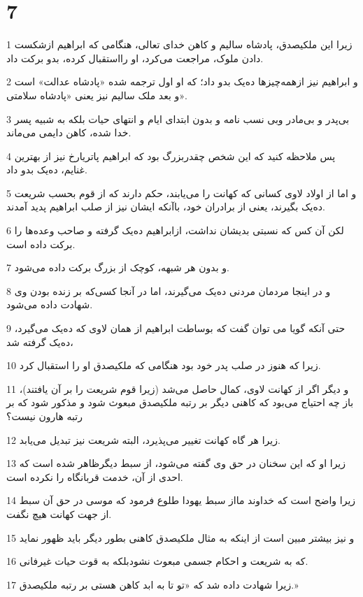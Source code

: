 \chapter{7}

\par 1 زیرا این ملکیصدق، پادشاه سالیم و کاهن خدای تعالی، هنگامی که ابراهیم ازشکست دادن ملوک، مراجعت می‌کرد، او رااستقبال کرده، بدو برکت داد.
\par 2 و ابراهیم نیز ازهمه‌چیزها ده‌یک بدو داد؛ که او اول ترجمه شده «پادشاه عدالت» است و بعد ملک سالیم نیز یعنی «پادشاه سلامتی».
\par 3 بی‌پدر و بی‌مادر وبی نسب نامه و بدون ابتدای ایام و انتهای حیات بلکه به شبیه پسر خدا شده، کاهن دایمی می‌ماند.
\par 4 پس ملاحظه کنید که این شخص چقدربزرگ بود که ابراهیم پاتریارخ نیز از بهترین غنایم، ده‌یک بدو داد.
\par 5 و اما از اولاد لاوی کسانی که کهانت را می‌یابند، حکم دارند که از قوم بحسب شریعت ده‌یک بگیرند، یعنی از برادران خود، باآنکه ایشان نیز از صلب ابراهیم پدید آمدند.
\par 6 لکن آن کس که نسبتی بدیشان نداشت، ازابراهیم ده‌یک گرفته و صاحب وعده‌ها را برکت داده است.
\par 7 و بدون هر شبهه، کوچک از بزرگ برکت داده می‌شود.
\par 8 و در اینجا مردمان مردنی ده‌یک می‌گیرند، اما در آنجا کسی‌که بر زنده بودن وی شهادت داده می‌شود.
\par 9 حتی آنکه گویا می توان گفت که بوساطت ابراهیم از همان لاوی که ده‌یک می‌گیرد، ده‌یک گرفته شد،
\par 10 زیرا که هنوز در صلب پدر خود بود هنگامی که ملکیصدق او را استقبال کرد.
\par 11 و دیگر اگر از کهانت لاوی، کمال حاصل می‌شد (زیرا قوم شریعت را بر آن یافتند)، باز چه احتیاج می‌بود که کاهنی دیگر بر رتبه ملکیصدق مبعوث شود و مذکور شود که بر رتبه هارون نیست؟
\par 12 زیرا هر گاه کهانت تغییر می‌پذیرد، البته شریعت نیز تبدیل می‌یابد.
\par 13 زیرا او که این سخنان در حق وی گفته می‌شود، از سبط دیگرظاهر شده است که احدی از آن، خدمت قربانگاه را نکرده است.
\par 14 زیرا واضح است که خداوند مااز سبط یهودا طلوع فرمود که موسی در حق آن سبط از جهت کهانت هیچ نگفت.
\par 15 و نیز بیشتر مبین است از اینکه به مثال ملکیصدق کاهنی بطور دیگر باید ظهور نماید
\par 16 که به شریعت و احکام جسمی مبعوث نشودبلکه به قوت حیات غیرفانی.
\par 17 زیرا شهادت داده شد که «تو تا به ابد کاهن هستی بر رتبه ملکیصدق.»

